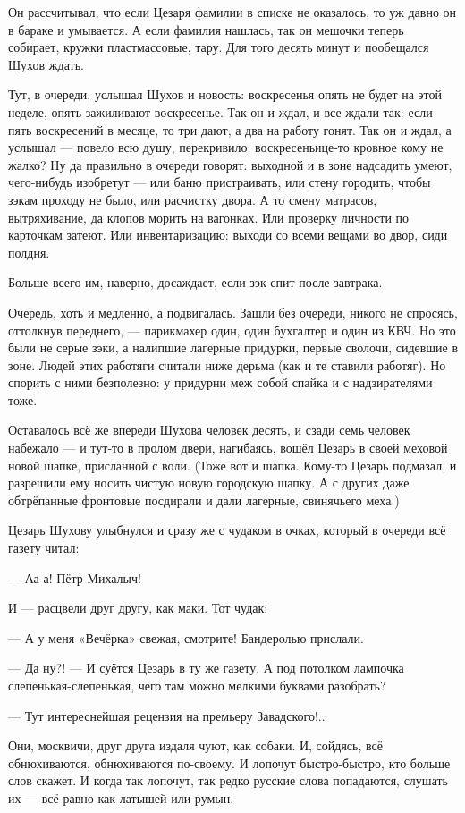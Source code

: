 Он рассчитывал, что если Цезаря фамилии в списке не оказалось, то уж давно он в бараке и умывается. А если фамилия нашлась, так он мешочки теперь собирает, кружки пластмассовые, тару. Для того десять минут и пообещался Шухов ждать.

Тут, в очереди, услышал Шухов и новость: воскресенья опять не будет на этой неделе, опять зажиливают воскресенье. Так он и ждал, и все ждали так: если пять воскресений в месяце, то три дают, а два на работу гонят. Так он и ждал, а услышал --- повело всю душу, перекривило: воскресеньице-то кровное кому не жалко? Ну да правильно в очереди говорят: выходной и в зоне надсадить умеют, чего-нибудь изобретут --- или баню пристраивать, или стену городить, чтобы зэкам проходу не было, или расчистку двора. А то смену матрасов, вытряхивание, да клопов морить на вагонках. Или проверку личности по карточкам затеют. Или инвентаризацию: выходи со всеми вещами во двор, сиди полдня.

Больше всего им, наверно, досаждает, если зэк спит после завтрака.

Очередь, хоть и медленно, а подвигалась. Зашли без очереди, никого не спросясь, оттолкнув переднего, --- парикмахер один, один бухгалтер и один из КВЧ. Но это были не серые зэки, а налипшие лагерные придурки, первые сволочи, сидевшие в зоне. Людей этих работяги считали ниже дерьма (как и те ставили работяг). Но спорить с ними безполезно: у придурни меж собой спайка и с надзирателями тоже.

Оставалось всё же впереди Шухова человек десять, и сзади семь человек набежало --- и тут-то в пролом двери, нагибаясь, вошёл Цезарь в своей меховой новой шапке, присланной с воли. (Тоже вот и шапка. Кому-то Цезарь подмазал, и разрешили ему носить чистую новую городскую шапку. А с других даже обтрёпанные фронтовые посдирали и дали лагерные, свинячьего меха.)

Цезарь Шухову улыбнулся и сразу же с чудаком в очках, который в очереди всё газету читал:

--- Аа-а! Пётр Михалыч!

И --- расцвели друг другу, как маки. Тот чудак:

--- А у меня «Вечёрка» свежая, смотрите! Бандеролью прислали.

--- Да ну?! --- И суётся Цезарь в ту же газету. А под потолком лампочка слепенькая-слепенькая, чего там можно мелкими буквами разобрать?

--- Тут интереснейшая рецензия на премьеру Завадского!..

Они, москвичи, друг друга издаля чуют, как собаки. И, сойдясь, всё обнюхиваются, обнюхиваются по-своему. И лопочут быстро-быстро, кто больше слов скажет. И когда так лопочут, так редко русские слова попадаются, слушать их --- всё равно как латышей или румын.

